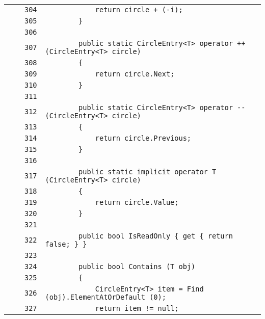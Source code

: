 \documentclass[a4paper,10pt]{article}
\begin{document}
\begin{longtable}[l]{lrrl}
\cellcolor{gray} &  & \verb~304~ & \verb~            return circle + (-i);~\\
\cellcolor{gray} &  & \verb~305~ & \verb~        }~\\
\cellcolor{gray} &  & \verb~306~ & \verb~~\\
\cellcolor{gray} &  & \verb~307~ & \verb~        public static CircleEntry<T> operator ++ (CircleEntry<T> circle)~\\
\cellcolor{gray} &  & \verb~308~ & \verb~        {~\\
\cellcolor{gray} &  & \verb~309~ & \verb~            return circle.Next;~\\
\cellcolor{gray} &  & \verb~310~ & \verb~        }~\\
\cellcolor{gray} &  & \verb~311~ & \verb~~\\
\cellcolor{gray} &  & \verb~312~ & \verb~        public static CircleEntry<T> operator -- (CircleEntry<T> circle)~\\
\cellcolor{gray} &  & \verb~313~ & \verb~        {~\\
\cellcolor{gray} &  & \verb~314~ & \verb~            return circle.Previous;~\\
\cellcolor{gray} &  & \verb~315~ & \verb~        }~\\
\cellcolor{gray} &  & \verb~316~ & \verb~~\\
\cellcolor{gray} &  & \verb~317~ & \verb~        public static implicit operator T (CircleEntry<T> circle)~\\
\cellcolor{gray} &  & \verb~318~ & \verb~        {~\\
\cellcolor{gray} &  & \verb~319~ & \verb~            return circle.Value;~\\
\cellcolor{gray} &  & \verb~320~ & \verb~        }~\\
\cellcolor{gray} &  & \verb~321~ & \verb~~\\
\cellcolor{gray} &  & \verb~322~ & \verb~        public bool IsReadOnly { get { return false; } }~\\
\cellcolor{gray} &  & \verb~323~ & \verb~~\\
\cellcolor{gray} &  & \verb~324~ & \verb~        public bool Contains (T obj)~\\
\cellcolor{gray} &  & \verb~325~ & \verb~        {~\\
\cellcolor{gray} &  & \verb~326~ & \verb~            CircleEntry<T> item = Find (obj).ElementAtOrDefault (0);~\\
\cellcolor{gray} &  & \verb~327~ & \verb~            return item != null;~\\

\end{longtable}
\end{document}
